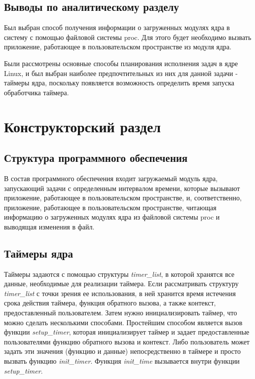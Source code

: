 \documentclass[a4paper,14pt]{extarticle}
\begin{document}
 	
 	\subsection*{Выводы по аналитическому разделу}
 	
 	Был выбран способ получения информации о загруженных модулях ядра в систему с помощью файловой системы proc. Для этого будет необходимо вызвать приложение, работающее в пользовательском пространстве из модуля ядра.
 	
 	Были рассмотрены основные способы планирования исполнения задач в ядре Linux, и был выбран наиболее предпочтительных из них для данной задачи - таймеры ядра, поскольку появляется возможность определить время запуска обработчика таймера.
 	
 	\newpage
 	
 	\section{Конструкторский раздел}
 	
 	\subsection{Структура программного обеспечения}
 	
 	В состав программного обеспечения входит загружаемый модуль яд­ра, запускающий задачи с определенным интервалом времени, которые вызывают приложение, работающее в пользовательском пространстве, и, соответственно, приложение, работающее в пользовательском пространстве, читающая информацию о загруженных модулях ядра из файловой системы proc и выводящая изменения в файл.
 	
 	\subsection{Таймеры ядра}
 	
 	Таймеры задаются с помощью структуры \textit{timer\_list}, в которой хранятся все данные, необходимые для реализации таймера. Если рассматривать структуру \textit{timer\_list} с точки зрения ее использования, в ней хранится время истечения срока действия таймера, функция обратного вызова, а также контекст, предоставленный пользователем. Затем нужно инициализировать таймер, что можно сделать несколькими способами. Простейшим способом является вызов функции \textit{setup\_timer}, которая инициализирует таймер и задает предоставленные пользователями функцию обратного вызова и контекст. Либо пользователь может задать эти значения (функцию и данные) непосредственно в таймере и просто вызвать функцию \textit{init\_timer}. Функция \textit{init\_time} вызывается внутри функции \textit{setup\_timer}.
 	
\end{document}
